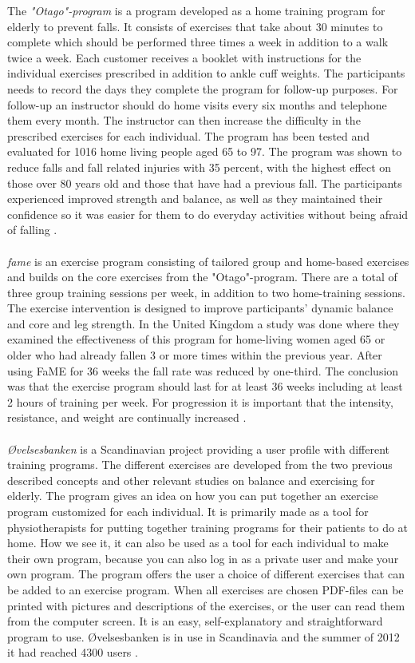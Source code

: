 The \emph{"Otago"-program} is a program developed as a home training program for elderly to prevent falls. It consists of exercises that take about 30 minutes to complete which should be performed three times a week in addition to a walk twice a week. Each customer receives a booklet with instructions for the individual exercises prescribed in addition to ankle cuff weights. The participants needs to record the days they complete the program for follow-up purposes. For follow-up an instructor should do home visits every six months and telephone them every month. The instructor can then increase the difficulty in the prescribed exercises for each individual. The program has been tested and evaluated for 1016 home living people aged 65 to 97. The program was shown to reduce falls and fall related injuries with 35 percent, with the highest effect on those over 80 years old and those that have had a previous fall. The participants experienced improved strength and balance, as well as they maintained their confidence so it was easier for them to do everyday activities without being afraid of falling \cite{otago} \cite{gruppetrening-trheim}.\\ \\
\emph{\ac{fame}} is an exercise program consisting of tailored group and home-based exercises and builds on the core exercises from the "Otago"-program.  There are a total of three group training sessions per week, in addition to two home-training sessions. The exercise intervention is designed to improve participants' dynamic balance and core and leg strength.  In the United Kingdom a study was done where they examined the effectiveness of this program for home-living women aged 65 or older who had already fallen 3 or more times within the previous year. After using FaME for 36 weeks the fall rate was reduced by one-third. The conclusion was that the exercise program should last for at least 36 weeks including at least 2 hours of training per week. For progression it is important that the intensity, resistance, and weight are continually increased \cite{fame}.\\ \\
\emph{{Ø}velsesbanken} is a Scandinavian project providing a user profile with different training programs. The different exercises are developed from the two previous described concepts and other relevant studies on balance and exercising for elderly. The program gives an idea on how you can put together an exercise program customized for each individual. It is primarily made as a tool for physiotherapists for putting together training programs for their patients to do at home. How we see it, it can also be used as a tool for each individual to make their own program, because you can also log in as a private user and make your own program. The program offers the user a choice of different exercises that can be added to an exercise program. When all exercises are chosen PDF-files can be printed with pictures and descriptions of the exercises, or the user can read them from the computer screen. It is an easy, self-explanatory and straightforward program to use. {Ø}velsesbanken is in use in Scandinavia and the summer of 2012 it had reached 4300 users \cite{ovelsesbank}.\\ \\
